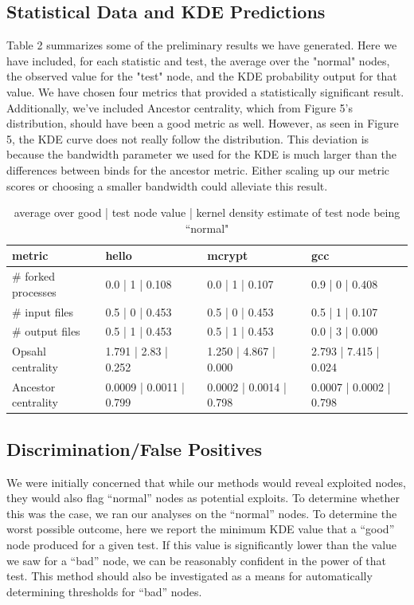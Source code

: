 \documentclass[10pt,twocolumn]{article}
\begin{document}
\subsection{Statistical Data and KDE Predictions}
Table 2 summarizes some of the preliminary results we have generated. Here we have included, for each statistic and test, the average over the "normal" nodes, the observed value for the "test" node, and the KDE probability output for that value. We have chosen four metrics that provided a statistically significant result. Additionally, we've included Ancestor centrality, which from Figure 5's distribution, should have been a good metric as well. However, as seen in Figure 5, the KDE curve does not really follow the distribution. This deviation is because the bandwidth parameter we used for the KDE is much larger than the differences between binds for the ancestor metric. Either scaling up our metric scores or choosing a smaller bandwidth could alleviate this result.
\begin{table}[ht]
\label{results}
{\small
  \begin{center}
  \begin{tabular}{| l | l | l | l |}
    \hline
    metric & hello & mcrypt & gcc \\ \hline
     \# forked processes & 0.0 | 1 | 0.108 & 0.0 | 1 | 0.107 & 0.9 | 0 | 0.408 \\ \hline
     \# input files & 0.5 | 0 | 0.453 & 0.5 | 0 | 0.453 & 0.5 | 1 | 0.107 \\ \hline
     \# output files & 0.5 | 1 | 0.453 & 0.5 | 1 | 0.453 & 0.0 | 3 | 0.000 \\ \hline
    Opsahl centrality & 1.791 | 2.83 | 0.252 & 1.250 | 4.867 | 0.000 & 2.793 | 7.415 | 0.024 \\ \hline
    Ancestor centrality & 0.0009 | 0.0011 | 0.799 & 0.0002 | 0.0014 | 0.798 & 0.0007 | 0.0002 | 0.798 \\

    \hline
  \end{tabular}
  \end{center}
}
\hfill{}
\caption{average over good | test node value | kernel density estimate of test node being ``normal"
}
\label{tb:tablename}
\end{table}
\subsection{Discrimination/False Positives}
We were initially concerned that while our methods would reveal exploited nodes, they would also flag ``normal'' nodes as potential exploits. To determine whether this was the case, we ran our analyses on the ``normal'' nodes. To determine the worst possible outcome, here we report the minimum KDE value that a ``good'' node produced for a given test. If this value is significantly lower than the value we saw for a ``bad'' node, we can be reasonably confident in the power of that test. This method should also be investigated as a means for automatically determining thresholds for ``bad'' nodes. 
\end{document}
